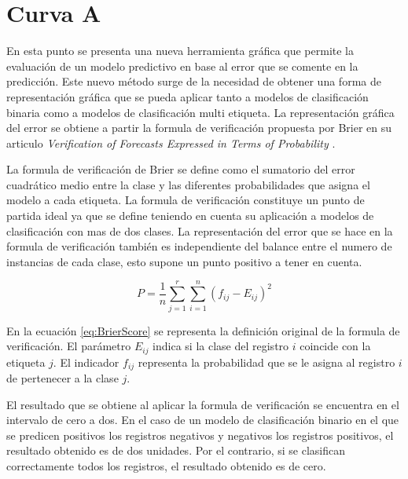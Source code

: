 \section{Curva A}

En esta punto se presenta una nueva herramienta gráfica que permite la evaluación de un modelo predictivo en base al error que se comente en la predicción. Este nuevo método surge de la necesidad de obtener una forma de representación gráfica que se pueda aplicar tanto a modelos de clasificación binaria como a modelos de clasificación multi etiqueta. La representación gráfica del error se obtiene a partir la formula de verificación propuesta por Brier en su articulo \textit{Verification of Forecasts Expressed in Terms of Probability} \cite{brie_1950}.

\bigbreak

La formula de verificación de Brier se define como el sumatorio del error cuadrático medio entre la clase y las diferentes probabilidades que asigna el modelo a cada etiqueta. La formula de verificación constituye un punto de partida ideal ya que se define teniendo en cuenta su aplicación a modelos de clasificación con mas de dos clases. La representación del error que se hace en la formula de verificación también es independiente del balance entre el numero de instancias de cada clase, esto supone un punto positivo a tener en cuenta.

\bigbreak

\begin{equation}
    P = \frac{1}{n}\sum_{j=1}^{r}\sum_{i=1}^{n}{(f_{ij}-E_{ij})^{2}}
    \label{eq:BrierScore}
\end{equation}

\bigbreak


En la ecuación \ref{eq:BrierScore} se representa la definición original de la formula de verificación. El parámetro $E_{ij}$ indica si la clase del registro $i$ coincide con la etiqueta $j$. El indicador $f_{ij}$ representa la probabilidad que se le asigna al registro $i$ de pertenecer a la clase $j$.

\bigbreak

El resultado que se obtiene al aplicar la formula de verificación se encuentra en el intervalo de cero a dos. En el caso de un modelo de clasificación binario en el que se predicen positivos los registros negativos y negativos los registros positivos, el resultado obtenido es de dos unidades. Por el contrario, si se clasifican correctamente todos los registros, el resultado obtenido es de cero.

